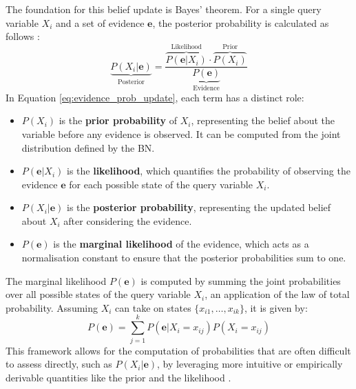 The foundation for this belief update is Bayes' theorem. For a single query variable $X_i$ and a set of evidence $\mathbf{e}$, the posterior probability is calculated as follows \citep{pearl2022external}:
%
\begin{equation}
\label{eq:evidence_prob_update}
\underbrace{P(X_i | \mathbf{e})}_{\text{Posterior}} = \frac{\overbrace{P(\mathbf{e} | X_i)}^{\text{Likelihood}} \cdot \overbrace{P(X_i)}^{\text{Prior}}}{\underbrace{P(\mathbf{e})}_{\text{Evidence}}}
\end{equation}
%
In Equation \ref{eq:evidence_prob_update}, each term has a distinct role:
\begin{itemize}
    \item $P(X_i)$ is the \textbf{prior probability} of $X_i$, representing the belief about the variable before any evidence is observed. It can be computed from the joint distribution defined by the BN.
    \item $P(\mathbf{e} | X_i)$ is the \textbf{likelihood}, which quantifies the probability of observing the evidence $\mathbf{e}$ for each possible state of the query variable $X_i$.
    \item $P(X_i | \mathbf{e})$ is the \textbf{posterior probability}, representing the updated belief about $X_i$ after considering the evidence.
    \item $P(\mathbf{e})$ is the \textbf{marginal likelihood} of the evidence, which acts as a normalisation constant to ensure that the posterior probabilities sum to one.
\end{itemize}

The marginal likelihood $P(\mathbf{e})$ is computed by summing the joint probabilities over all possible states of the query variable $X_i$, an application of the law of total probability. Assuming $X_i$ can take on states $\{x_{i1}, \dots, x_{ik}\}$, it is given by:
%
\begin{equation}
\label{eq:sum_denominador}
P(\mathbf{e}) = \sum_{j=1}^{k} P(\mathbf{e} | X_i = x_{ij}) P(X_i = x_{ij})
\end{equation}
%
This framework allows for the computation of probabilities that are often difficult to assess directly, such as $P(X_i | \mathbf{e})$, by leveraging more intuitive or empirically derivable quantities like the prior and the likelihood \cite{caetano2024resilience}.